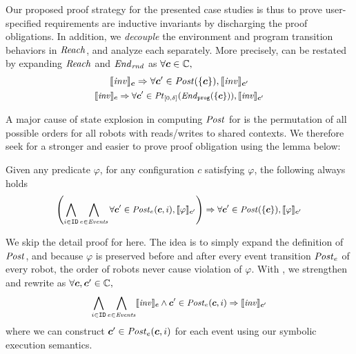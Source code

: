 Our proposed proof strategy for the presented case studies is thus to prove
user-specified requirements are inductive invariants by discharging the proof obligations.
In addition, we \emph{decouple} the environment and program transition behaviors in $\mathit{Reach}$,
and analyze each separately.
More precisely,  can be restated by expanding $\mathit{Reach}$ and $\mathit{End}_\mathit{rnd}$ as $\forall \mathit{\boldsymbol{c}} \in \mathbb{C},$
\begin{gather}
\llbracket\mathit{inv}\rrbracket_{\mathit{\boldsymbol{c}}} \Rightarrow \forall \mathit{\boldsymbol{c}}' \in \mathit{Post}(\left\{\mathit{\boldsymbol{c}}\right\}), \llbracket\mathit{inv}\rrbracket_{\mathit{\boldsymbol{c}}'}\label{po:ind-hyp-prog}\\
\small
\llbracket\mathit{inv}\rrbracket_{\mathit{\boldsymbol{c}}} \Rightarrow \forall \mathit{\boldsymbol{c}}' \in \mathit{Pt}_{[0,\delta]}(\mathit{End}_{\mathtt{prog}}(\left\{\mathit{\boldsymbol{c}}\right\})), \llbracket\mathit{inv}\rrbracket_{\mathit{\boldsymbol{c}}'}\label{po:ind-hyp-env}
\end{gather}

A major cause of state explosion in computing $\mathit{Post}$ for 
is the permutation of all possible orders for all robots
with reads/writes to shared contexts.
We therefore seek for a stronger and easier to prove proof obligation using the lemma below:
\begin{lemma}
   \label{lem:noninter}
Given any predicate $\varphi$,
for any configuration $c$ satisfying $\varphi$, the following always holds
\[
\small
\left(\bigwedge_{i\in \texttt{ID}}\bigwedge_{e \in \mathit{Events}} \forall \mathit{\boldsymbol{c}}' \in \mathit{Post}_e(\mathit{\boldsymbol{c}}, i), \llbracket\varphi\rrbracket_{\mathit{\boldsymbol{c}}'}\right)
    \Rightarrow \forall \mathit{\boldsymbol{c}}' \in \mathit{Post}(\left\{\mathit{\boldsymbol{c}}\right\}), \llbracket\varphi\rrbracket_{\mathit{\boldsymbol{c}}'}
\]
\end{lemma}
We skip the detail proof for  here.
The idea is to simply expand the definition of $\mathit{Post}$,
and because $\varphi$ is preserved before and after every event transition $\mathit{Post}_e$ of every robot,
the order of robots never cause violation of $\varphi$.
With , we strengthen and rewrite  as $\forall \mathit{\boldsymbol{c}}, \mathit{\boldsymbol{c}}' \in \mathbb{C},$
\begin{equation}
\small
\bigwedge_{i\in \texttt{ID}}\bigwedge_{e \in \mathit{Events}} \llbracket\mathit{inv}\rrbracket_{\mathit{\boldsymbol{c}}} \land \mathit{\boldsymbol{c}}' \in \mathit{Post}_e(\mathit{\boldsymbol{c}}, i)
    \Rightarrow \llbracket\mathit{inv}\rrbracket_{\mathit{\boldsymbol{c}}'}\label{po:ind-hyp-event}
\end{equation}
where we can construct $\mathit{\boldsymbol{c}}' \in \mathit{Post}_e(\mathit{\boldsymbol{c}}, i)$ for each event
using our \K symbolic execution semantics.

